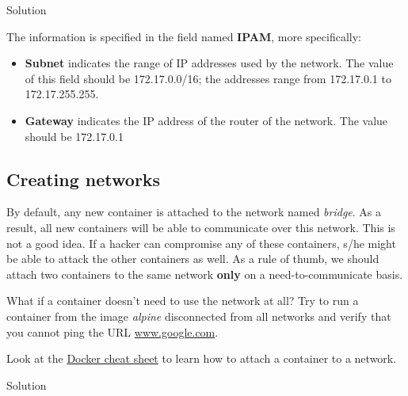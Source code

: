 \documentclass[
]{article}
\newenvironment{infobox}[1]
  {
  \begin{itemize}
  \renewcommand{\labelitemi}{
    \raisebox{-.7\height}[0pt][0pt]{
      
    }
  }
  \setlength{\fboxsep}{1em}
  \begin{whitebox}
  \item
  }
  {
  \end{whitebox}
  \end{itemize}
  }
\theoremstyle{definition}
\theoremstyle{definition}
\theoremstyle{definition}
\theoremstyle{remark}
\let\BeginKnitrBlock\begin \let\EndKnitrBlock\end
\begin{document}
Solution

\begin{infobox}{exercisebox}

The information is specified in the field named \textbf{IPAM}, more specifically:

\begin{itemize}
\item
  \textbf{Subnet} indicates the range of IP addresses used by the network.
  The value of this field should be 172.17.0.0/16;
  the addresses range from 172.17.0.1 to 172.17.255.255.
\item
  \textbf{Gateway} indicates the IP address of the router of the network.
  The value should be 172.17.0.1
\end{itemize}

\end{infobox}

\hypertarget{creating-networks}{%
\subsection{Creating networks}\label{creating-networks}}

By default, any new container is attached to the network named \emph{bridge}.
As a result, all new containers will be able to communicate over this network.
This is not a good idea.
If a hacker can compromise any of these containers, s/he might
be able to attack the other containers as well.
As a rule of thumb, we should attach two containers to the same network \textbf{only} on a
need-to-communicate basis.

\begin{infobox}{exercisebox}

\BeginKnitrBlock{exercise}
\protect\hypertarget{exr:unnamed-chunk-33}{}{\label{exr:unnamed-chunk-33} }What if a container doesn't need to use the network at all?
Try to run a container from the image \emph{alpine}
disconnected from all networks and
verify that you cannot ping the URL
\href{http://www.google.com}{www.google.com}.

Look at the \href{/courses/cloud-computing/docker-cheat-sheet}{Docker cheat sheet}
to learn how to attach a container to a network.
\EndKnitrBlock{exercise}

\end{infobox}

Solution
\end{document}
